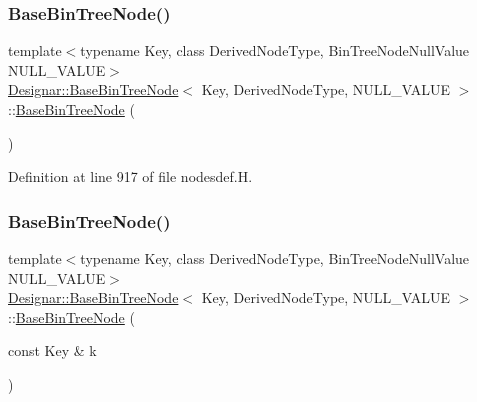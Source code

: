 \subsubsection{\texorpdfstring{Base\+Bin\+Tree\+Node()}{BaseBinTreeNode()}\hspace{0.1cm}{\footnotesize\ttfamily [1/5]}}
{\footnotesize\ttfamily template$<$typename Key, class Derived\+Node\+Type, Bin\+Tree\+Node\+Null\+Value N\+U\+L\+L\+\_\+\+V\+A\+L\+UE$>$ \\
\hyperlink{class_designar_1_1_base_bin_tree_node}{Designar\+::\+Base\+Bin\+Tree\+Node}$<$ Key, Derived\+Node\+Type, N\+U\+L\+L\+\_\+\+V\+A\+L\+UE $>$\+::\hyperlink{class_designar_1_1_base_bin_tree_node}{Base\+Bin\+Tree\+Node} (\begin{DoxyParamCaption}{ }\end{DoxyParamCaption})\hspace{0.3cm}{\ttfamily [inline]}}



Definition at line 917 of file nodesdef.\+H.

\mbox{\label{class_designar_1_1_base_bin_tree_node_a19dbfd3695d9213dc0d50a4637e92b16}} 
\subsubsection{\texorpdfstring{Base\+Bin\+Tree\+Node()}{BaseBinTreeNode()}\hspace{0.1cm}{\footnotesize\ttfamily [2/5]}}
{\footnotesize\ttfamily template$<$typename Key, class Derived\+Node\+Type, Bin\+Tree\+Node\+Null\+Value N\+U\+L\+L\+\_\+\+V\+A\+L\+UE$>$ \\
\hyperlink{class_designar_1_1_base_bin_tree_node}{Designar\+::\+Base\+Bin\+Tree\+Node}$<$ Key, Derived\+Node\+Type, N\+U\+L\+L\+\_\+\+V\+A\+L\+UE $>$\+::\hyperlink{class_designar_1_1_base_bin_tree_node}{Base\+Bin\+Tree\+Node} (\begin{DoxyParamCaption}\item[{const Key \&}]{k }\end{DoxyParamCaption})\hspace{0.3cm}{\ttfamily [inline]}}



